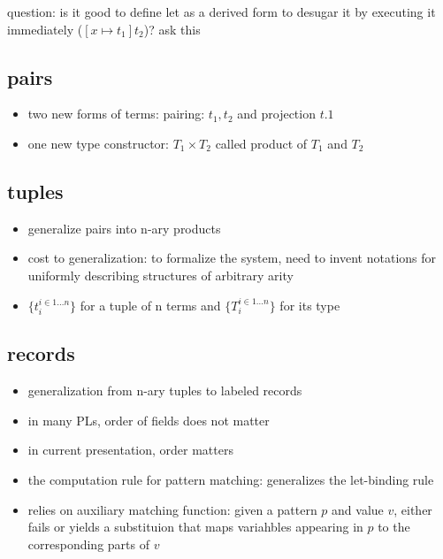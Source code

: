 \documentclass[11pt]{article}
\begin{document}
question: is it good to define let as a derived form to desugar it by executing it immediately (\([x \mapsto t_1]t_2\))? ask this

\subsection{pairs}
\label{sec:orge165765}
\begin{itemize}
\item two new forms of terms: pairing: \({t_1,t_2}\) and projection \(t.1\)
\item one new type constructor: \(T_1 \times T_2\) called product of \(T_1\) and \(T_2\)
\end{itemize}

\subsection{tuples}
\label{sec:org3530369}
\begin{itemize}
\item generalize pairs into n-ary products
\item cost to generalization: to formalize the system, need to invent notations for uniformly describing structures of arbitrary arity
\item \(\{t_i^{i \in 1...n}\}\) for a tuple of n terms and \(\{T_i^{i \in 1...n}\}\) for its type
\end{itemize}

\subsection{records}
\label{sec:org3a56e3e}
\begin{itemize}
\item generalization from n-ary tuples to labeled records
\item in many PLs, order of fields does not matter
\item in current presentation, order matters
\item the computation rule for pattern matching: generalizes the let-binding rule
\item relies on auxiliary matching function: given a pattern \(p\) and value \(v\), either fails or yields a substituion that maps variahbles appearing in \(p\) to the corresponding parts of \(v\)
\end{itemize}
\end{document}

